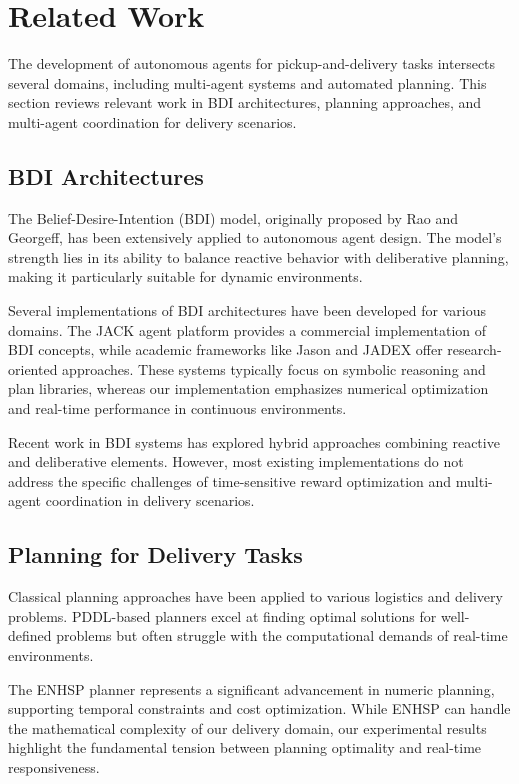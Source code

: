 \section{Related Work}

The development of autonomous agents for pickup-and-delivery tasks intersects several domains, including multi-agent systems and automated planning. This section reviews relevant work in BDI architectures, planning approaches, and multi-agent coordination for delivery scenarios.

\subsection{BDI Architectures}

The Belief-Desire-Intention (BDI) model, originally proposed by Rao and Georgeff, has been extensively applied to autonomous agent design. The model's strength lies in its ability to balance reactive behavior with deliberative planning, making it particularly suitable for dynamic environments.

Several implementations of BDI architectures have been developed for various domains. The JACK agent platform provides a commercial implementation of BDI concepts, while academic frameworks like Jason and JADEX offer research-oriented approaches. These systems typically focus on symbolic reasoning and plan libraries, whereas our implementation emphasizes numerical optimization and real-time performance in continuous environments.

Recent work in BDI systems has explored hybrid approaches combining reactive and deliberative elements. However, most existing implementations do not address the specific challenges of time-sensitive reward optimization and multi-agent coordination in delivery scenarios.

\subsection{Planning for Delivery Tasks}

Classical planning approaches have been applied to various logistics and delivery problems. PDDL-based planners excel at finding optimal solutions for well-defined problems but often struggle with the computational demands of real-time environments.

The ENHSP planner \cite{scala2016enhsp} represents a significant advancement in numeric planning, supporting temporal constraints and cost optimization. While ENHSP can handle the mathematical complexity of our delivery domain, our experimental results highlight the fundamental tension between planning optimality and real-time responsiveness.

